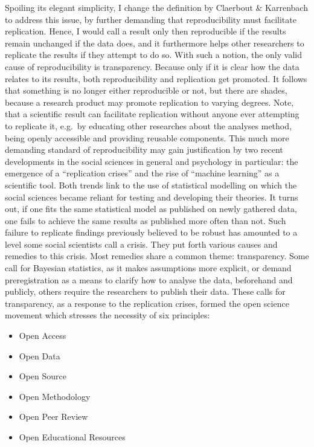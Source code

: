 \documentclass[]{book}
\providecommand{\tightlist}{%
  \setlength{\itemsep}{0pt}\setlength{\parskip}{0pt}}
\begin{document}
Spoiling its elegant simplicity, I change the definition by Claerbout \& Karrenbach to address this issue, by further demanding that reproducibility must facilitate replication.
Hence, I would call a result only then reproducible if the results remain unchanged if the data does, and it furthermore helps other researchers to replicate the results if they attempt to do so.
With such a notion, the only valid cause of reproducibility is transparency.
Because only if it is clear how the data relates to its results, both reproducibility and replication get promoted.
It follows that something is no longer either reproducible or not, but there are shades, because a research product may promote replication to varying degrees.
Note, that a scientific result can facilitate replication without anyone ever attempting to replicate it, e.g.~by educating other researches about the analyses method, being openly accessible and providing reusable components.
This much more demanding standard of reproducibility may gain justification by two recent developments in the social sciences in general and psychology in particular: the emergence of a ``replication crises'' and the rise of ``machine learning'' as a scientific tool.
Both trends link to the use of statistical modelling on which the social sciences became reliant for testing and developing their theories.
It turns out, if one fits the same statistical model as published on newly gathered data, one fails to achieve the same results as published more often than not.
Such failure to replicate findings previously believed to be robust has amounted to a level some social scientists call a crisis.
They put forth various causes and remedies to this crisis.
Most remedies share a common theme: transparency.
Some call for Bayesian statistics, as it makes assumptions more explicit, or demand preregistration as a means to clarify how to analyse the data, beforehand and publicly, others require the researchers to publish their data.
These calls for transparency, as a response to the replication crises, formed the open science movement which stresses the necessity of six principles:

\begin{itemize}
\tightlist
\item
  Open Access
\item
  Open Data
\item
  Open Source
\item
  Open Methodology
\item
  Open Peer Review
\item
  Open Educational Resources
\end{itemize}
\end{document}
